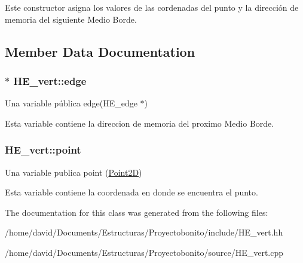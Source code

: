 Este constructor asigna los valores de las cordenadas del punto y la dirección de memoria del siguiente Medio Borde. 

\subsection{Member Data Documentation}
\hypertarget{class_h_e__vert_aec66f48f9a8d4e687f0d4a84d961ef9e}{
\subsubsection[{edge}]{$\ast$ H\-E\-\_\-vert\-::edge}}\label{class_h_e__vert_aec66f48f9a8d4e687f0d4a84d961ef9e}


Una variable pública edge(\-H\-E\-\_\-edge $\ast$) 

Esta variable contiene la direccion de memoria del proximo Medio Borde. \hypertarget{class_h_e__vert_af9f502918fbb0d79d4ed99ade0e8daea}{
\subsubsection[{point}]{ H\-E\-\_\-vert\-::point}}\label{class_h_e__vert_af9f502918fbb0d79d4ed99ade0e8daea}


Una variable publica point (\hyperlink{class_point2_d}{Point2\-D}) 

Esta variable contiene la coordenada en donde se encuentra el punto. 

The documentation for this class was generated from the following files\-:\begin{DoxyCompactItemize}
\item 
/home/david/\-Documents/\-Estructuras/\-Proyectobonito/include/H\-E\-\_\-vert.\-hh\item 
/home/david/\-Documents/\-Estructuras/\-Proyectobonito/source/H\-E\-\_\-vert.\-cpp\end{DoxyCompactItemize}
